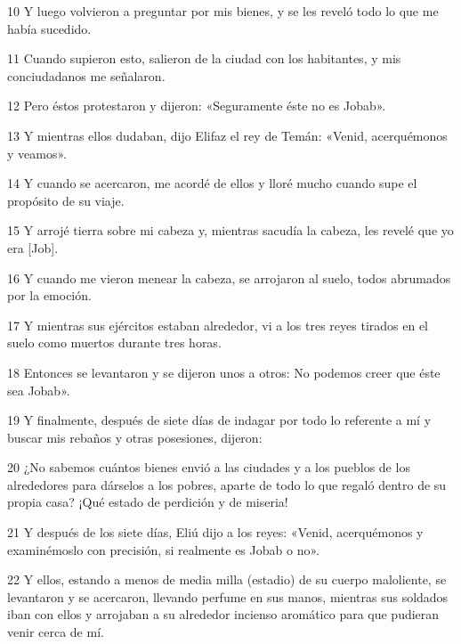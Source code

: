 \par 10 Y luego volvieron a preguntar por mis bienes, y se les reveló todo lo que me había sucedido.

\par 11 Cuando supieron esto, salieron de la ciudad con los habitantes, y mis conciudadanos me señalaron.

\par 12 Pero éstos protestaron y dijeron: «Seguramente éste no es Jobab».

\par 13 Y mientras ellos dudaban, dijo Elifaz el rey de Temán: «Venid, acerquémonos y veamos».

\par 14 Y cuando se acercaron, me acordé de ellos y lloré mucho cuando supe el propósito de su viaje.

\par 15 Y arrojé tierra sobre mi cabeza y, mientras sacudía la cabeza, les revelé que yo era [Job].

\par 16 Y cuando me vieron menear la cabeza, se arrojaron al suelo, todos abrumados por la emoción.

\par 17 Y mientras sus ejércitos estaban alrededor, vi a los tres reyes tirados en el suelo como muertos durante tres horas.

\par 18 Entonces se levantaron y se dijeron unos a otros: No podemos creer que éste sea Jobab».

\par 19 Y finalmente, después de siete días de indagar por todo lo referente a mí y buscar mis rebaños y otras posesiones, dijeron:

\par 20 ¿No sabemos cuántos bienes envió a las ciudades y a los pueblos de los alrededores para dárselos a los pobres, aparte de todo lo que regaló dentro de su propia casa? ¡Qué estado de perdición y de miseria!

\par 21 Y después de los siete días, Eliú dijo a los reyes: «Venid, acerquémonos y examinémoslo con precisión, si realmente es Jobab o no».

\par 22 Y ellos, estando a menos de media milla (estadio) de su cuerpo maloliente, se levantaron y se acercaron, llevando perfume en sus manos, mientras sus soldados iban con ellos y arrojaban a su alrededor incienso aromático para que pudieran venir cerca de mí.

